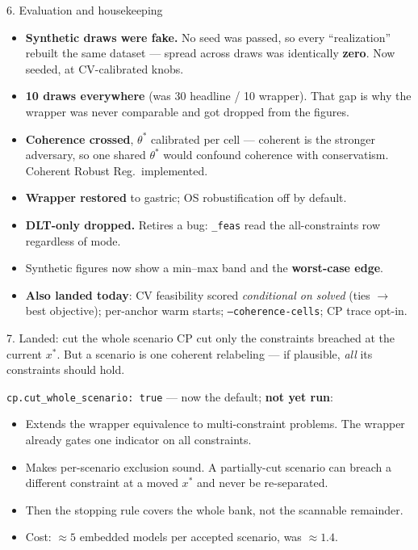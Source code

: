 \documentclass{beamer}
\begin{document}
\begin{frame}{6. Evaluation and housekeeping}
  \small
  \begin{itemize}
    \item \textbf{Synthetic draws were fake.} No seed was passed, so every
      ``realization'' rebuilt the same dataset --- spread across draws was
      identically \textbf{zero}. Now seeded, at CV-calibrated knobs.
    \item \textbf{10 draws everywhere} (was 30 headline / 10 wrapper). That gap is why
      the wrapper was never comparable and got dropped from the figures.
    \item \textbf{Coherence crossed}, $\theta^\ast$ calibrated per cell --- coherent is
      the stronger adversary, so one shared $\theta^\ast$ would confound coherence with
      conservatism. Coherent Robust Reg.\ implemented.
    \item \textbf{Wrapper restored} to gastric; OS robustification off by default.
    \item \textbf{DLT-only dropped.} Retires a bug: \texttt{\_feas} read the
      all-constraints row regardless of mode.
    \item Synthetic figures now show a min--max band and the \textbf{worst-case edge}.
    \item \textbf{Also landed today}: CV feasibility scored \emph{conditional on
      solved} (ties $\to$ best objective); per-anchor warm starts;
      \texttt{--coherence-cells}; CP trace opt-in.
  \end{itemize}
\end{frame}

\begin{frame}{7. Landed: cut the whole scenario}
  \small
  CP cut only the constraints breached at the current $x^\ast$. But a scenario is one
  coherent relabeling --- if plausible, \emph{all} its constraints should hold.
  \medskip

  \texttt{cp.cut\_whole\_scenario: true} --- now the default; \textbf{not yet run}:
  \begin{itemize}
    \item Extends the wrapper equivalence to multi-constraint problems. The wrapper
      already gates one indicator on all constraints.
    \item Makes per-scenario exclusion sound. A partially-cut scenario can breach a
      different constraint at a moved $x^\ast$ and never be re-separated.
    \item Then the stopping rule covers the whole bank, not the scannable remainder.
    \item Cost: ${\approx}5$ embedded models per accepted scenario, was ${\approx}1.4$.
  \end{itemize}
\end{frame}
\end{document}
